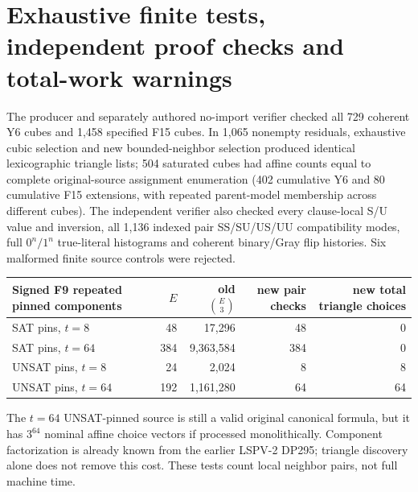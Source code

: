 \documentclass[11pt]{article}
\begin{document}
\section{Exhaustive finite tests, independent proof checks and total-work warnings}
The producer and separately authored no-import verifier checked all 729 coherent Y6 cubes and 1,458 specified F15 cubes. In 1,065 nonempty residuals, exhaustive cubic selection and new bounded-neighbor selection produced identical lexicographic triangle lists; 504 saturated cubes had affine counts equal to complete original-source assignment enumeration (402 cumulative Y6 and 80 cumulative F15 extensions, with repeated parent-model membership across different cubes). The independent verifier also checked every clause-local S/U value and inversion, all 1,136 indexed pair SS/SU/US/UU compatibility modes, full $0^n/1^n$ true-literal histograms and coherent binary/Gray flip histories. Six malformed finite source controls were rejected.

\begin{center}\begin{tabular}{lrrrr}\toprule
Signed F9 repeated pinned components & $E$ & old $\binom E3$ & new pair checks & new total triangle choices\\\midrule
SAT pins, $t=8$ &48&17,296&48&0\\
SAT pins, $t=64$ &384&9,363,584&384&0\\
UNSAT pins, $t=8$ &24&2,024&8&8\\
UNSAT pins, $t=64$ &192&1,161,280&64&64\\\bottomrule\end{tabular}\end{center}
The $t=64$ UNSAT-pinned source is still a valid original canonical formula, but it has $3^{64}$ nominal affine choice vectors if processed monolithically. Component factorization is already known from the earlier LSPV-2 DP295; triangle discovery alone does not remove this cost. These tests count local neighbor pairs, not full machine time.
\end{document}
